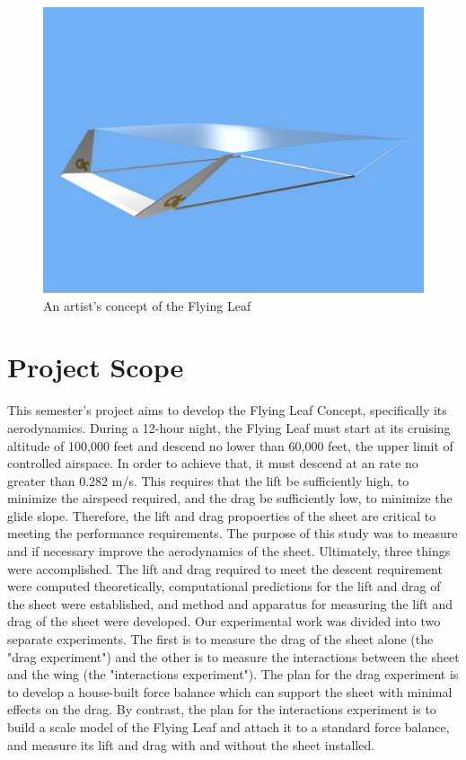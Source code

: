 \documentclass[12pt]{report} %
\begin{document}
\begin{figure}
\includegraphics[width = 0.7\linewidth]{FlyingCarpet.jpg}
\centering
\caption{An artist's concept of the Flying Leaf}
\label{flyingLeaf}
\end{figure}

\section{Project Scope}
This semester's project aims to develop the Flying Leaf Concept, specifically its aerodynamics. During a 12-hour night, the Flying Leaf must start
at its cruising altitude of 100,000 feet and descend no lower than 60,000 feet, the upper limit of controlled airspace. In order to achieve
that, it must descend at an rate no greater than 0.282 m/s. This requires that the lift be sufficiently high, to minimize the airspeed required,
and the drag be sufficiently low, to minimize the glide slope. Therefore, the lift and drag propoerties of the sheet are critical to meeting
the performance requirements. The purpose of this study was to measure and if necessary improve the aerodynamics of the sheet. Ultimately,
three things were accomplished. The lift and drag required to meet the descent requirement were computed theoretically, computational predictions
for the lift and drag of the sheet were established, and method and apparatus for measuring the lift and drag of the sheet were developed.
Our experimental work was divided into two separate experiments. The first is to measure the drag of the sheet alone (the "drag experiment")
and the other is to measure the interactions between the sheet and the wing (the "interactions experiment"). The plan for the drag experiment
is to develop a house-built force balance which can support the sheet with minimal effects on the drag. By contrast, the plan for the interactions
experiment is to build a scale model of the Flying Leaf and attach it to a standard force balance, and measure its lift and drag with and without
the sheet installed.
\end{document}
